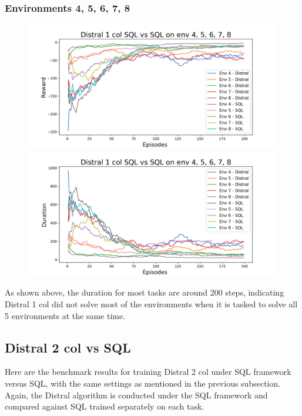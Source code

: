 \documentclass[12pt]{report}
\begin{document}
\subsubsection{Environments 4, 5, 6, 7, 8}
\begin{figure}[H]
\centering
\begin{minipage}{.5\textwidth}
\centering
\includegraphics[width=\textwidth]{figs/d1_col_sql/d1_col_sql_4_5_6_7_8_rwd.png}
\end{minipage}%
\centering
\begin{minipage}{.5\textwidth}
\centering
\includegraphics[width=\textwidth]{figs/d1_col_sql/d1_col_sql_4_5_6_7_8_dur.png}
\end{minipage}%
\end{figure}
As shown above, the duration for most tasks are around 200 steps, indicating Distral 1 col did not solve most of the environments when it is tasked to solve all 5 environments at the same time.

\subsection{Distral 2 col vs SQL}

Here are the benchmark results for training Distral 2 col under SQL framework versus SQL, with the same settings as mentioned in the previous subsection. Again, the Distral algorithm is conducted under the SQL framework and compared against SQL trained separately on each task.
\end{document}
